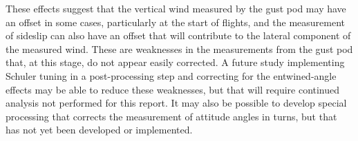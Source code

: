 \documentclass[12pt,twoside,english]{article}\usepackage[]{graphicx}\usepackage[]{color}
\begin{document}
These effects suggest that the vertical wind measured by the gust pod may have an offset in some cases, particularly at the start of flights, and the measurement of sideslip can also have an offset that will contribute to the lateral component of the measured wind. These are weaknesses in the measurements from the gust pod that, at this stage, do not appear easily corrected. A future study implementing Schuler tuning in a post-processing step and correcting for the entwined-angle effects may be able to reduce these weaknesses, but that will require continued analysis not performed for this report. It may also be possible to develop special processing that corrects the measurement of attitude angles in turns, but that has not yet been developed or implemented. 
% 
\end{document}
